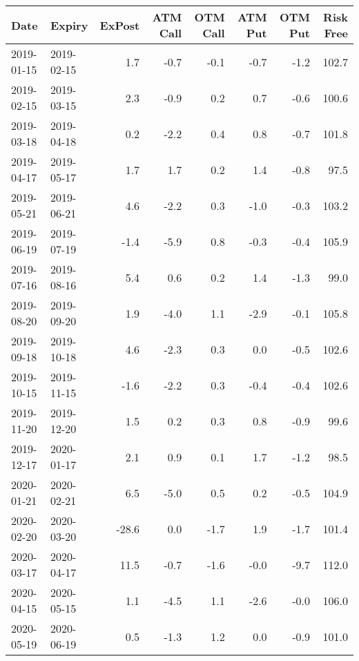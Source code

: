 \begin{tabular}{llrrrrrr}
\hline
 Date       & Expiry     &   ExPost &   ATM Call &   OTM Call &   ATM Put &   OTM Put &   Risk Free \\
\hline
 2019-01-15 & 2019-02-15 &      1.7 &       -0.7 &       -0.1 &      -0.7 &      -1.2 &       102.7 \\
 2019-02-15 & 2019-03-15 &      2.3 &       -0.9 &        0.2 &       0.7 &      -0.6 &       100.6 \\
 2019-03-18 & 2019-04-18 &      0.2 &       -2.2 &        0.4 &       0.8 &      -0.7 &       101.8 \\
 2019-04-17 & 2019-05-17 &      1.7 &        1.7 &        0.2 &       1.4 &      -0.8 &        97.5 \\
 2019-05-21 & 2019-06-21 &      4.6 &       -2.2 &        0.3 &      -1.0 &      -0.3 &       103.2 \\
 2019-06-19 & 2019-07-19 &     -1.4 &       -5.9 &        0.8 &      -0.3 &      -0.4 &       105.9 \\
 2019-07-16 & 2019-08-16 &      5.4 &        0.6 &        0.2 &       1.4 &      -1.3 &        99.0 \\
 2019-08-20 & 2019-09-20 &      1.9 &       -4.0 &        1.1 &      -2.9 &      -0.1 &       105.8 \\
 2019-09-18 & 2019-10-18 &      4.6 &       -2.3 &        0.3 &       0.0 &      -0.5 &       102.6 \\
 2019-10-15 & 2019-11-15 &     -1.6 &       -2.2 &        0.3 &      -0.4 &      -0.4 &       102.6 \\
 2019-11-20 & 2019-12-20 &      1.5 &        0.2 &        0.3 &       0.8 &      -0.9 &        99.6 \\
 2019-12-17 & 2020-01-17 &      2.1 &        0.9 &        0.1 &       1.7 &      -1.2 &        98.5 \\
 2020-01-21 & 2020-02-21 &      6.5 &       -5.0 &        0.5 &       0.2 &      -0.5 &       104.9 \\
 2020-02-20 & 2020-03-20 &    -28.6 &        0.0 &       -1.7 &       1.9 &      -1.7 &       101.4 \\
 2020-03-17 & 2020-04-17 &     11.5 &       -0.7 &       -1.6 &      -0.0 &      -9.7 &       112.0 \\
 2020-04-15 & 2020-05-15 &      1.1 &       -4.5 &        1.1 &      -2.6 &      -0.0 &       106.0 \\
 2020-05-19 & 2020-06-19 &      0.5 &       -1.3 &        1.2 &       0.0 &      -0.9 &       101.0 \\

\end{tabular}
